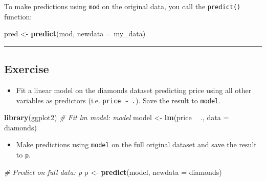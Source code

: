 \documentclass[]{book}
\newenvironment{Shaded}{\begin{snugshade}}{\end{snugshade}}
\newcommand{\KeywordTok}[1]{\textcolor[rgb]{0.13,0.29,0.53}{\textbf{#1}}}
\newcommand{\DataTypeTok}[1]{\textcolor[rgb]{0.13,0.29,0.53}{#1}}
\newcommand{\StringTok}[1]{\textcolor[rgb]{0.31,0.60,0.02}{#1}}
\newcommand{\CommentTok}[1]{\textcolor[rgb]{0.56,0.35,0.01}{\textit{#1}}}
\newcommand{\OperatorTok}[1]{\textcolor[rgb]{0.81,0.36,0.00}{\textbf{#1}}}
\newcommand{\NormalTok}[1]{#1}
\providecommand{\tightlist}{%
  \setlength{\itemsep}{0pt}\setlength{\parskip}{0pt}}
\begin{document}
To make predictions using \texttt{mod} on the original data, you call
the \texttt{predict()} function:

\begin{Shaded}
\begin{Highlighting}[]
\NormalTok{pred <-}\StringTok{ }\KeywordTok{predict}\NormalTok{(mod, }\DataTypeTok{newdata =}\NormalTok{ my_data)}
\end{Highlighting}
\end{Shaded}

\begin{center}\rule{0.5\linewidth}{\linethickness}\end{center}

\subsection*{Exercise}\label{exercise}

\begin{itemize}
\tightlist
\item
  Fit a linear model on the diamonds dataset predicting price using all
  other variables as predictors (i.e.
  \texttt{price\ \textasciitilde{}\ .}). Save the result to
  \texttt{model}.
\end{itemize}

\begin{Shaded}
\begin{Highlighting}[]
\KeywordTok{library}\NormalTok{(ggplot2)}
\CommentTok{# Fit lm model: model}
\NormalTok{model <-}\StringTok{ }\KeywordTok{lm}\NormalTok{(price }\OperatorTok{~}\StringTok{ }\NormalTok{., }\DataTypeTok{data =}\NormalTok{ diamonds)}
\end{Highlighting}
\end{Shaded}

\begin{itemize}
\tightlist
\item
  Make predictions using \texttt{model} on the full original dataset and
  save the result to \texttt{p}.
\end{itemize}

\begin{Shaded}
\begin{Highlighting}[]
\CommentTok{# Predict on full data: p}
\NormalTok{p <-}\StringTok{ }\KeywordTok{predict}\NormalTok{(model, }\DataTypeTok{newdata =}\NormalTok{ diamonds)}
\end{Highlighting}
\end{Shaded}
\end{document}
